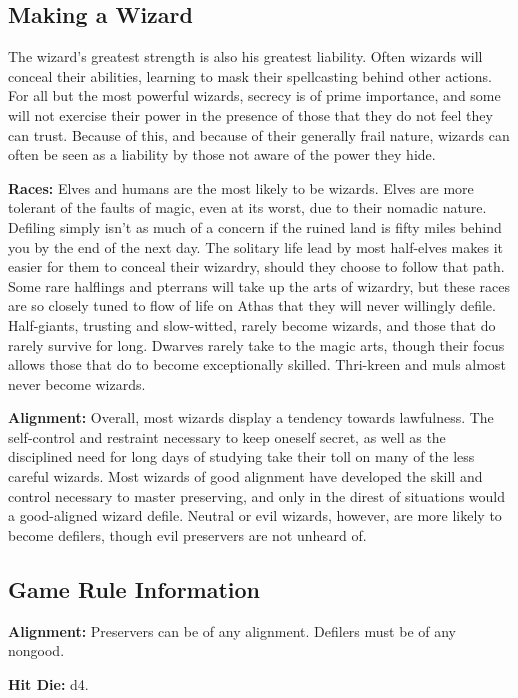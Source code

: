 \subsection{Making a Wizard}
The wizard's greatest strength is also his greatest liability. Often wizards will conceal their abilities, learning to mask their spellcasting behind other actions. For all but the most powerful wizards, secrecy is of prime importance, and some will not exercise their power in the presence of those that they do not feel they can trust. Because of this, and because of their generally frail nature, wizards can often be seen as a liability by those not aware of the power they hide.

\textbf{Races:} Elves and humans are the most likely to be wizards. Elves are more tolerant of the faults of magic, even at its worst, due to their nomadic nature. Defiling simply isn't as much of a concern if the ruined land is fifty miles behind you by the end of the next day. The solitary life lead by most half-elves makes it easier for them to conceal their wizardry, should they choose to follow that path. Some rare halflings and pterrans will take up the arts of wizardry, but these races are so closely tuned to flow of life on Athas that they will never willingly defile. Half-giants, trusting and slow-witted, rarely become wizards, and those that do rarely survive for long. Dwarves rarely take to the magic arts, though their focus allows those that do to become exceptionally skilled. Thri-kreen and muls almost never become wizards.

\textbf{Alignment:} Overall, most wizards display a tendency towards lawfulness. The self-control and restraint necessary to keep oneself secret, as well as the disciplined need for long days of studying take their toll on many of the less careful wizards. Most wizards of good alignment have developed the skill and control necessary to master preserving, and only in the direst of situations would a good-aligned wizard defile. Neutral or evil wizards, however, are more likely to become defilers, though evil preservers are not unheard of.

\subsection{Game Rule Information}

\textbf{Alignment:} Preservers can be of any alignment. Defilers must be of any nongood.

\textbf{Hit Die:} d4.

